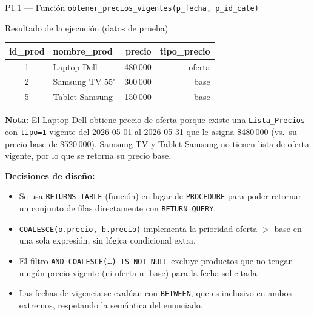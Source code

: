 \documentclass[12pt,a4paper]{article}
\begin{document}
\begin{querybox}{P1.1 --- Función \texttt{obtener\_precios\_vigentes(p\_fecha, p\_id\_cate)}}
\vspace{0.4cm}

\begin{resultbox}{Resultado de la ejecución (datos de prueba)}
\begin{center}
\begin{tabular}{clrr}
  \toprule
  \textbf{id\_prod} & \textbf{nombre\_prod} & \textbf{precio} & \textbf{tipo\_precio} \\
  \midrule
  1 & Laptop Dell    & 480\,000 & oferta \\
  2 & Samsung TV 55" & 300\,000 & base   \\
  5 & Tablet Samsung & 150\,000 & base   \\
  \bottomrule
\end{tabular}
\end{center}
\footnotesize
\textbf{Nota:} El Laptop Dell obtiene precio de oferta porque existe una
\texttt{Lista\_Precios} con \texttt{tipo=1} vigente del 2026-05-01 al 2026-05-31
que le asigna \$480\,000 (vs.\ su precio base de \$520\,000).
Samsung TV y Tablet Samsung no tienen lista de oferta vigente,
por lo que se retorna su precio base.
\end{resultbox}

\vspace{0.3cm}
\textbf{Decisiones de diseño:}
\begin{itemize}[leftmargin=1.5em,itemsep=2pt]
  \item Se usa \texttt{RETURNS TABLE} (función) en lugar de \texttt{PROCEDURE}
        para poder retornar un conjunto de filas directamente con \texttt{RETURN QUERY}.
  \item \texttt{COALESCE(o.precio, b.precio)} implementa la prioridad oferta $>$ base
        en una sola expresión, sin lógica condicional extra.
  \item El filtro \texttt{AND COALESCE(\ldots) IS NOT NULL} excluye productos que
        no tengan ningún precio vigente (ni oferta ni base) para la fecha solicitada.
  \item Las fechas de vigencia se evalúan con \texttt{BETWEEN}, que es inclusivo en
        ambos extremos, respetando la semántica del enunciado.
\end{itemize}

\end{querybox}

\vspace{0.8cm}
\end{document}
